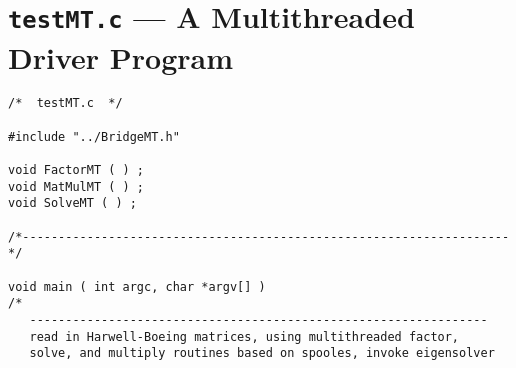 \chapter{{\tt testMT.c} --- A Multithreaded Driver Program}
\label{chapter:MT_driver}

\begin{verbatim}
/*  testMT.c  */

#include "../BridgeMT.h"

void FactorMT ( ) ;
void MatMulMT ( ) ;
void SolveMT ( ) ;

/*--------------------------------------------------------------------*/

void main ( int argc, char *argv[] )
/*
   ----------------------------------------------------------------
   read in Harwell-Boeing matrices, using multithreaded factor, 
   solve, and multiply routines based on spooles, invoke eigensolver


\end{verbatim}
